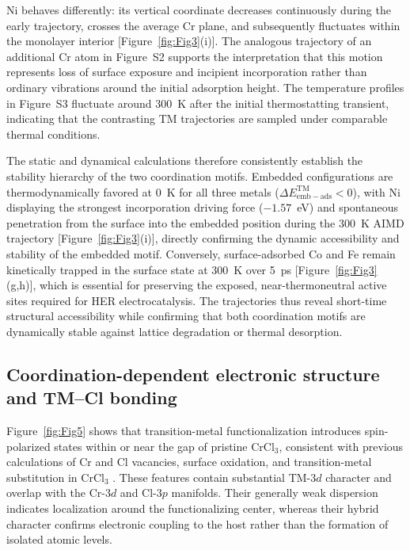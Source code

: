 \documentclass[journal=jacsat,manuscript=article]{achemso}
\begin{document}
Ni behaves differently: its vertical coordinate decreases continuously during the early trajectory, crosses the average Cr plane, and subsequently fluctuates within the monolayer interior [Figure~\ref{fig:Fig3}(i)]. The analogous trajectory of an additional Cr atom in Figure~S2 supports the interpretation that this motion represents loss of surface exposure and incipient incorporation rather than ordinary vibrations around the initial adsorption height. The temperature profiles in Figure~S3 fluctuate around 300~K after the initial thermostatting transient, indicating that the contrasting TM trajectories are sampled under comparable thermal conditions.

The static and dynamical calculations therefore consistently establish the stability hierarchy of the two coordination motifs. Embedded configurations are thermodynamically favored at 0~K for all three metals ($\Delta E_{\mathrm{emb-ads}}^{\mathrm{TM}} < 0$), with Ni displaying the strongest incorporation driving force ($-1.57$~eV) and spontaneous penetration from the surface into the embedded position during the 300~K AIMD trajectory [Figure~\ref{fig:Fig3}(i)], directly confirming the dynamic accessibility and stability of the embedded motif. Conversely, surface-adsorbed Co and Fe remain kinetically trapped in the surface state at 300~K over 5~ps [Figure~\ref{fig:Fig3}(g,h)], which is essential for preserving the exposed, near-thermoneutral active sites required for HER electrocatalysis. The trajectories thus reveal short-time structural accessibility while confirming that both coordination motifs are dynamically stable against lattice degradation or thermal desorption.


\subsection{Coordination-dependent electronic structure and TM--Cl bonding}

\noindent Figure~\ref{fig:Fig5} shows that transition-metal functionalization introduces spin-polarized states within or near the gap of pristine CrCl$_3$, consistent with previous calculations of Cr and Cl vacancies, surface oxidation, and transition-metal substitution in CrCl$_3$ \cite{Gao2018,Mastrippolito2021,Wang2019,Safi2023}. These features contain substantial TM-$3d$ character and overlap with the Cr-$3d$ and Cl-$3p$ manifolds. Their generally weak dispersion indicates localization around the functionalizing center, whereas their hybrid character confirms electronic coupling to the host rather than the formation of isolated atomic levels.
\end{document}
